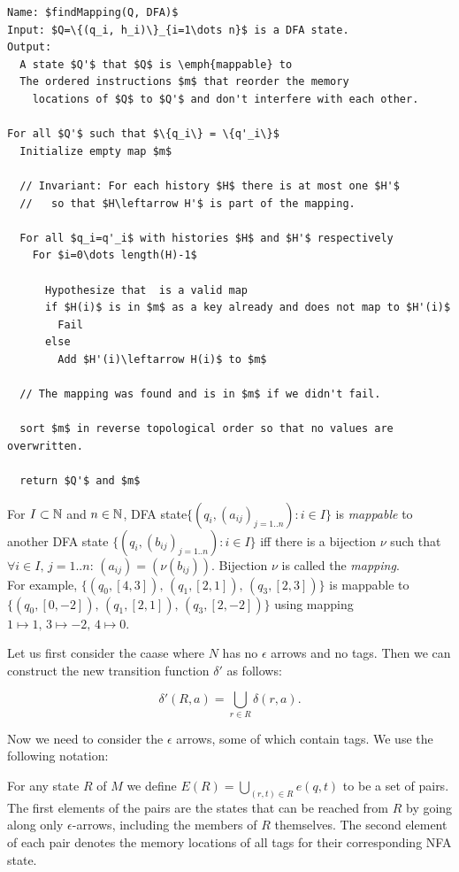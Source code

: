 \documentclass[english]{sigplanconf}
\begin{document}
\begin{algorithm*}
\begin{lstlisting}[mathescape]
Name: $findMapping(Q, DFA)$
Input: $Q=\{(q_i, h_i)\}_{i=1\dots n}$ is a DFA state.
Output: 
  A state $Q'$ that $Q$ is \emph{mappable} to
  The ordered instructions $m$ that reorder the memory 
    locations of $Q$ to $Q'$ and don't interfere with each other.
    
For all $Q'$ such that $\{q_i\} = \{q'_i\}$
  Initialize empty map $m$
  
  // Invariant: For each history $H$ there is at most one $H'$
  //   so that $H\leftarrow H'$ is part of the mapping.
  
  For all $q_i=q'_i$ with histories $H$ and $H'$ respectively
    For $i=0\dots length(H)-1$
    
      Hypothesize that  is a valid map
      if $H(i)$ is in $m$ as a key already and does not map to $H'(i)$
        Fail
      else
        Add $H'(i)\leftarrow H(i)$ to $m$
        
  // The mapping was found and is in $m$ if we didn't fail.
  
  sort $m$ in reverse topological order so that no values are overwritten.
  
  return $Q'$ and $m$
\end{lstlisting}
\end{algorithm*}

For $I\subset\mathbb{N}$ and $n\in\mathbb{N}$, DFA state$\{(q_{i},(a_{ij})_{j=1..n}):i\in I\}$
is \emph{mappable} to another DFA state $\{(q_{i},(b_{ij})_{j=1..n}):i\in I\}$
iff there is a bijection $\nu$ such that $\forall i\in I,\, j=1..n:\,(a_{ij})=(\nu(b_{ij}))$.
Bijection $\nu$ is called the \emph{mapping}.\\
For example, $\{(q_{0},[4,3]),\,(q_{1},[2,1]),\,(q_{3},[2,3])\}$
is mappable to $\{(q_{0},[0,-2]),\,(q_{1},[2,1]),\,(q_{3},[2,-2])\}$
using mapping $1\mapsto1,\,3\mapsto-2,\,4\mapsto0$.

Let us first consider the caase where $N$ has no $\epsilon$ arrows
and no tags. Then we can construct the new transition function $\delta'$
as follows:

\[
\delta'(R,a)=\bigcup_{r\in R}\delta(r,a)\mbox{.}
\]

Now we need to consider the $\epsilon$ arrows, some of which contain
tags. We use the following notation:

For any state $R$ of $M$ we define $E(R)=\bigcup_{(r,t)\in R}e(q,t)$
to be a set of pairs. The first elements of the pairs are the states
that can be reached from $R$ by going along only $\epsilon$-arrows,
including the members of $R$ themselves. The second element of each
pair denotes the memory locations of all tags for their corresponding
NFA state.
\end{document}
